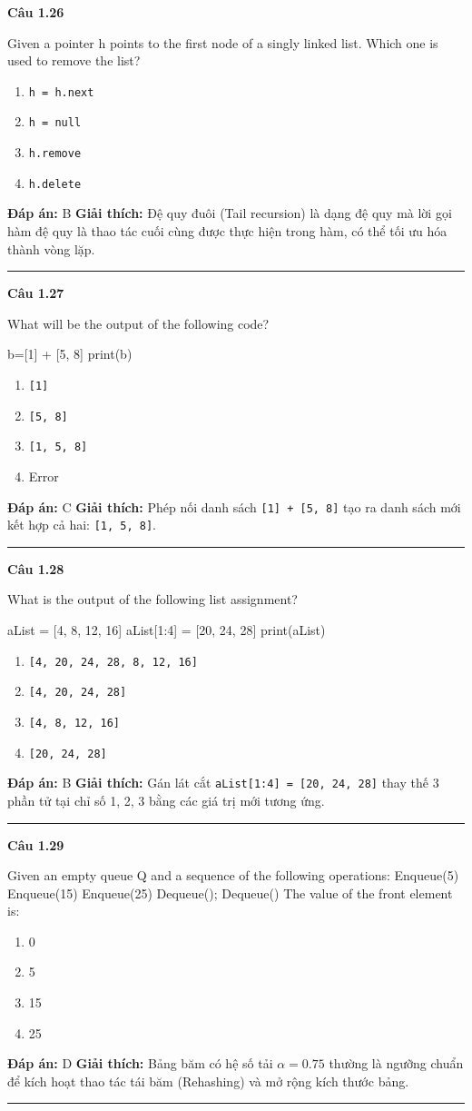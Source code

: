 \documentclass[11pt,a4paper]{article}
\newenvironment{question}[1]{%
  \par\vspace{1em}\noindent\textbf{\large Câu #1}\par\vspace{0.4em}
}{%
  \par\vspace{1em}\hrule\vspace{0.6em}
}
\newenvironment{choices}{%
  \begin{enumerate}[label=\textbf{\Alph*.},leftmargin=2.2em,itemsep=2pt,topsep=3pt]
}{%
  \end{enumerate}
}
\newcommand{\choice}{\item}
\newenvironment{codebox}{%
  \begin{tcolorbox}[colback=gray!8!white,colframe=gray!50!black,arc=1.5mm,boxrule=0.6pt,left=3mm,right=3mm,top=2.5mm,bottom=2.5mm]
  \ttfamily\small
}{%
  \end{tcolorbox}
}
\begin{document}
\begin{question}{1.26}
Given a pointer h points to the first node of a singly linked list. Which one is used to remove the list?
\begin{choices}
\choice \texttt{h = h.next}
\choice \texttt{h = null}
\choice \texttt{h.remove}
\choice \texttt{h.delete}
\end{choices}
\textbf{Đáp án:} B
\textbf{Giải thích:} Đệ quy đuôi (Tail recursion) là dạng đệ quy mà lời gọi hàm đệ quy là thao tác cuối cùng được thực hiện trong hàm, có thể tối ưu hóa thành vòng lặp.
\end{question}

\begin{question}{1.27}
What will be the output of the following code?
\begin{codebox}
b=[1] + [5, 8]
print(b)
\end{codebox}
\begin{choices}
\choice \texttt{[1]}
\choice \texttt{[5, 8]}
\choice \texttt{[1, 5, 8]}
\choice Error
\end{choices}
\textbf{Đáp án:} C
\textbf{Giải thích:} Phép nối danh sách \texttt{[1] + [5, 8]} tạo ra danh sách mới kết hợp cả hai: \texttt{[1, 5, 8]}.
\end{question}

\begin{question}{1.28}
What is the output of the following list assignment?
\begin{codebox}
aList = [4, 8, 12, 16]
aList[1:4] = [20, 24, 28]
print(aList)
\end{codebox}
\begin{choices}
\choice \texttt{[4, 20, 24, 28, 8, 12, 16]}
\choice \texttt{[4, 20, 24, 28]}
\choice \texttt{[4, 8, 12, 16]}
\choice \texttt{[20, 24, 28]}
\end{choices}
\textbf{Đáp án:} B
\textbf{Giải thích:} Gán lát cắt \texttt{aList[1:4] = [20, 24, 28]} thay thế 3 phần tử tại chỉ số 1, 2, 3 bằng các giá trị mới tương ứng.
\end{question}

\begin{question}{1.29}
Given an empty queue Q and a sequence of the following operations: Enqueue(5) Enqueue(15) Enqueue(25) Dequeue(); Dequeue() The value of the front element is:
\begin{choices}
\choice 0
\choice 5
\choice 15
\choice 25
\end{choices}
\textbf{Đáp án:} D
\textbf{Giải thích:} Bảng băm có hệ số tải $\alpha = 0.75$ thường là ngưỡng chuẩn để kích hoạt thao tác tái băm (Rehashing) và mở rộng kích thước bảng.
\end{question}
\end{document}
